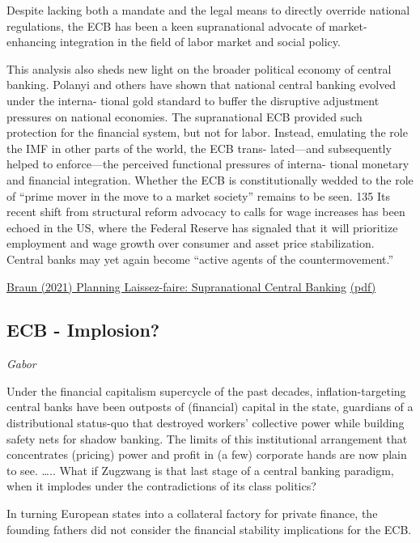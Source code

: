 \documentclass[
]{book}
\begin{document}
Despite lacking both a mandate and the legal
means to directly override national regulations, the ECB has been a keen supranational
advocate of market-enhancing integration in the field of labor market and social policy.

This analysis also sheds new light on the broader political economy of central banking.
Polanyi and others have shown that national central banking evolved under the interna-
tional gold standard to buffer the disruptive adjustment pressures on national economies.
The supranational ECB provided such protection for the financial system, but not for
labor. Instead, emulating the role the IMF in other parts of the world, the ECB trans-
lated---and subsequently helped to enforce---the perceived functional pressures of interna-
tional monetary and financial integration. Whether the ECB is constitutionally wedded
to the role of ``prime mover in the move to a market society'' remains to be seen. 135 Its
recent shift from structural reform advocacy to calls for wage increases has been echoed
in the US, where the Federal Reserve has signaled that it will prioritize employment and
wage growth over consumer and asset price stabilization. Central banks may yet again
become ``active agents of the countermovement.''

\href{https://osf.io/preprints/socarxiv/dp3nv}{Braun (2021) Planning Laissez-faire: Supranational Central Banking}
\href{pdf/Braun_2021_Planning_laissez-faire.pdf}{(pdf)}

\hypertarget{ecb---implosion}{%
\subsection{ECB - Implosion?}\label{ecb---implosion}}

\emph{Gabor}

Under the financial capitalism supercycle of the past decades, inflation-targeting central banks have been outposts of (financial) capital in the state, guardians of a distributional status-quo that destroyed workers' collective power while building safety nets for shadow banking. The limits of this institutional arrangement that concentrates (pricing) power and profit in (a few) corporate hands are now plain to see. \ldots..
What if Zugzwang is that last stage of a central banking paradigm, when it implodes under the contradictions of its class politics?

In turning European states into a collateral factory for private finance, the founding fathers did not consider the financial stability implications for the ECB.
\end{document}
